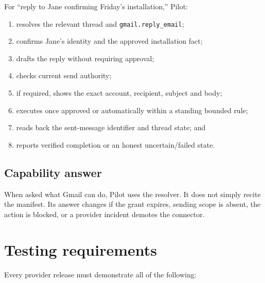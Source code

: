 \documentclass[11pt,a4paper]{article}
\newcommand{\code}[1]{\texttt{#1}}
\begin{document}
For ``reply to Jane confirming Friday's installation,'' Pilot:

\begin{enumerate}
  \item resolves the relevant thread and \code{gmail.reply\_email};
  \item confirms Jane's identity and the approved installation fact;
  \item drafts the reply without requiring approval;
  \item checks current send authority;
  \item if required, shows the exact account, recipient, subject and body;
  \item executes once approved or automatically within a standing bounded rule;
  \item reads back the sent-message identifier and thread state; and
  \item reports verified completion or an honest uncertain/failed state.
\end{enumerate}

\subsection{Capability answer}

When asked what Gmail can do, Pilot uses the resolver. It does not simply recite
the manifest. Its answer changes if the grant expires, sending scope is absent,
the action is blocked, or a provider incident demotes the connector.

\section{Testing requirements}

Every provider release must demonstrate all of the following:
\end{document}
